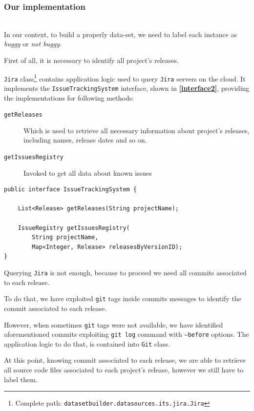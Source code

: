\documentclass[sigconf]{acmart}
\begin{document}
\subsubsection{Our implementation}
\hfill\\

In our context, to build a properly data-set, we need to label each instance as \textit{buggy} or \textit{not buggy}. 

First of all, it is necessary to identify all project's releases. 

\texttt{Jira} class\footnote{Complete path: \texttt{datasetbuilder.datasources.its.jira.Jira}} contains application logic used to query \texttt{Jira} servers on the cloud. It implements the \texttt{Issue\-Tracking\-System} interface, shown in \textbf{\cref{interface2}}, providing the implementations for following methods:

\begin{description}
\item[\texttt{getReleases}] Which is used to retrieve all necessary information about project's releases, including names, release dates and so on.
\item[\texttt{getIssuesRegistry}] Invoked to get all data about known issues 
\end{description}

\begin{lstlisting}[frame=lines,basicstyle=\ttfamily\scriptsize, caption={\texttt{IssueTrackingSystem} interface}, label={interface2}]
public interface IssueTrackingSystem {

    List<Release> getReleases(String projectName);

    IssueRegistry getIssuesRegistry(
    	String projectName, 
    	Map<Integer, Release> releasesByVersionID);
}
\end{lstlisting}

Querying \texttt{Jira} is not enough, because to proceed we need all commits associated to each release.

To do that, we have exploited \texttt{git} tags inside commits messages to identify the commit associated to each release. 

However, when sometimes \texttt{git} tags were not available, we have identified aforementioned commits exploiting \texttt{git\- log} command with \texttt{--before\- [date]} options. The application logic to do that, is contained into \texttt{Git} class.

At this point, knowing commit associated to each release, we are able to retrieve all source code files associated to each project's release, however we still have to label them.
\end{document}

